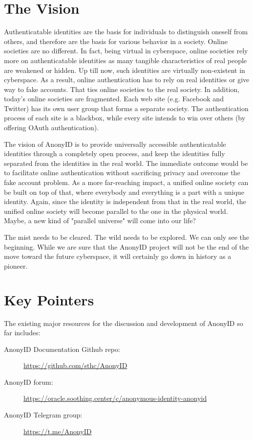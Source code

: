 \documentclass[12pt, a4paper]{article}
\begin{document}
\section{The Vision}

Authenticatable identities are the basis for individuals to distinguish oneself from others, and therefore are the basis for various behavior in a society. Online societies are no different. In fact, being virtual in cyberspace, online societies rely more on authenticatable identities as many tangible characteristics of real people are weakened or hidden. Up till now, such identities are virtually non-existent in cyberspace. As a result, online authentication has to rely on real identities or give way to fake accounts. That ties online societies to the real society. In addition, today's online societies are fragmented. Each web site (e.g. Facebook and Twitter) has its own user group that forms a separate society. The authentication process of each site is a blackbox, while every site intends to win over others (by offering OAuth authentication). 

The vision of AnonyID is to provide universally accessible authenticatable identities through a completely open process, and keep the identities fully separated from the identities in the real world. The immediate outcome would be to facilitate online authentication without sacrificing privacy and overcome the fake account problem. As a more far-reaching impact, a unified online society can be built on top of that, where everybody and everything is a part with a unique identity. Again, since the identity is independent from that in the real world, the unified online society will become parallel to the one in the physical world. Maybe, a new kind of "parallel universe" will come into our life?

The mist needs to be cleared. The wild needs to be explored. We can only see the beginning. While we are sure that the AnonyID project will not be the end of the move toward the future cyberspace, it will certainly go down in history as a pioneer. 

\section{Key Pointers}

The existing major resources for the discussion and development of AnonyID so far includes:

\begin{description}
\item[AnonyID Documentation Github repo:] \href{https://github.com/sthc/AnonyID}{https://github.com/sthc/AnonyID}
\item[AnonyID forum:] \href{https://oracle.soothing.center/c/anonymous-identity-anonyid}{https://oracle.soothing.center/c/anonymous-identity-anonyid}
\item[AnonyID Telegram group:] \href{https://t.me/AnonyID}{https://t.me/AnonyID}
\end{description}
\end{document}
